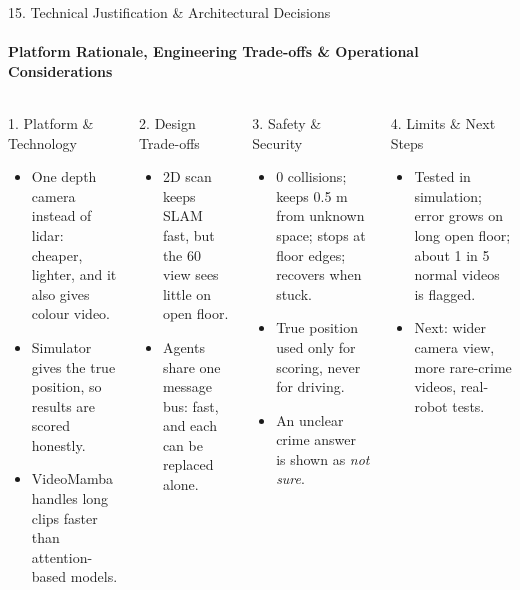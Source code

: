 \documentclass[aspectratio=169, 11pt]{beamer}
\begin{document}
\begin{frame}{15. Technical Justification \& Architectural Decisions}
    \framesubtitle{Platform Rationale, Engineering Trade-offs \& Operational Considerations}
    \begin{columns}[T]
        \begin{block}{1. Platform \& Technology}
            \footnotesize
            \begin{itemize}
                \item One depth camera instead of lidar: cheaper, lighter, and it also gives colour video.
                \item Simulator gives the true position, so results are scored honestly.
                \item VideoMamba handles long clips faster than attention-based models.
            \end{itemize}
        \end{block}

        \begin{block}{2. Design Trade-offs}
            \footnotesize
            \begin{itemize}
                \item 2D scan keeps SLAM fast, but the 60\textdegree{} view sees little on open floor.
                \item Agents share one message bus: fast, and each can be replaced alone.
            \end{itemize}
        \end{block}

        \begin{block}{3. Safety \& Security}
            \footnotesize
            \begin{itemize}
                \item 0 collisions; keeps 0.5 m from unknown space; stops at floor edges; recovers when stuck.
                \item True position used only for scoring, never for driving.
                \item An unclear crime answer is shown as \emph{not sure}.
            \end{itemize}
        \end{block}

        \begin{block}{4. Limits \& Next Steps}
            \footnotesize
            \begin{itemize}
                \item Tested in simulation; error grows on long open floor; about 1 in 5 normal videos is flagged.
                \item Next: wider camera view, more rare-crime videos, real-robot tests.
            \end{itemize}
        \end{block}
    \end{columns}    \end{frame}
\end{document}
